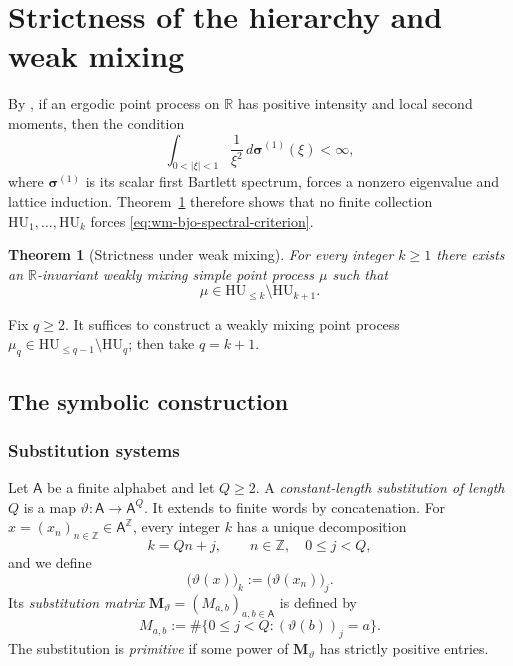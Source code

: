 \documentclass[11pt,reqno,a4paper]{amsart}
\numberwithin{equation}{section}
\theoremstyle{compact}
\newtheorem{theorem}{Theorem}[section]
\theoremstyle{definition}
\theoremstyle{definition}
\newcommand{\HU}{\mathrm{HU}}
\begin{document}
\section{Strictness of the hierarchy and weak mixing}
\label{sec:weak-mixing}

By
\cite[Theorem~4.1]{Bjo26a}, if an ergodic point process on $\mathbb R$ has
positive intensity and local second moments, then the condition
\begin{equation}\label{eq:wm-bjo-spectral-criterion}
  \int_{0<|\xi|<1}\frac{1}{\xi^2}\,
    d\boldsymbol\sigma^{(1)}(\xi)<\infty,
\end{equation}
where $\boldsymbol\sigma^{(1)}$ is its scalar first Bartlett spectrum, forces
a nonzero eigenvalue and lattice induction.  Theorem~\ref{thm:weak-mixing-strictness}
therefore shows that no finite collection $\HU_1,\ldots,\HU_k$ forces
\eqref{eq:wm-bjo-spectral-criterion}.

\begin{theorem}[Strictness under weak mixing]
\label{thm:weak-mixing-strictness}
For every integer $k\geq1$ there exists an $\mathbb R$-invariant weakly
mixing simple point process $\mu$ such that
\begin{equation}\label{eq:weak-mixing-strictness}
  \mu\in\HU_{\leq k}\setminus\HU_{k+1}.
\end{equation}
\end{theorem}

Fix $q\geq2$.  It suffices to construct a weakly mixing point process
$\mu_q\in\HU_{\leq q-1}\setminus\HU_q$; then take $q=k+1$.

\subsection{The symbolic construction}
\label{subsec:wm-substitution}

\subsubsection{Substitution systems}
Let $\mathsf A$ be a finite alphabet and let $Q\geq2$.
A \emph{constant-length substitution of length $Q$} is a map
$\vartheta:\mathsf A\to\mathsf A^Q$.  It extends to finite words by
concatenation.  For $x=(x_n)_{n\in\mathbb Z}\in\mathsf A^{\mathbb Z}$,
every integer $k$ has a unique decomposition
\[
  k=Qn+j,\qquad n\in\mathbb Z,\quad 0\leq j<Q,
\]
and we define
\begin{equation}\label{eq:wm-bi-infinite-substitution}
  \bigl(\vartheta(x)\bigr)_k
  :=\bigl(\vartheta(x_n)\bigr)_j.
\end{equation}
Its \emph{substitution matrix}
$\mathbf M_\vartheta=(M_{a,b})_{a,b\in\mathsf A}$ is defined by
\begin{equation}\label{eq:wm-substitution-matrix-definition}
  M_{a,b}
  :=\#\{0\leq j<Q:(\vartheta(b))_j=a\}.
\end{equation}
The substitution is \emph{primitive} if some power of
$\mathbf M_\vartheta$ has strictly positive entries.
\end{document}
